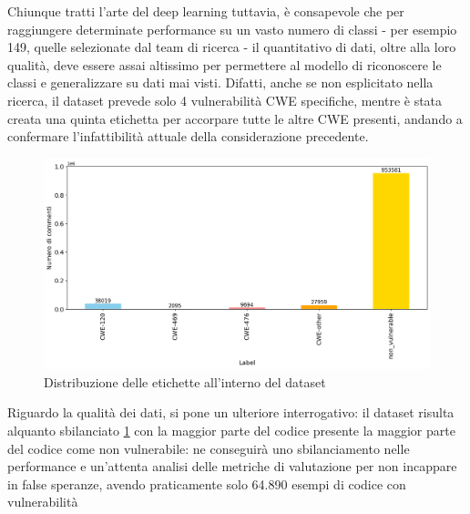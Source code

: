 \documentclass[conference]{IEEEtran}
\begin{document}
Chiunque tratti l'arte del deep learning tuttavia, è consapevole che per raggiungere determinate performance su un vasto numero di classi - per esempio 149, quelle selezionate dal team di ricerca - il quantitativo di dati, oltre alla loro qualità, deve essere assai altissimo per permettere al modello di riconoscere le classi e generalizzare su dati mai visti. Difatti, anche se non esplicitato nella ricerca, il dataset prevede solo 4 vulnerabilità CWE specifiche, mentre è stata creata una quinta etichetta per accorpare tutte le altre CWE presenti, andando a confermare l'infattibilità attuale della considerazione precedente.
%
\begin{figure}[h]
    \centering
    \includegraphics[width=\columnwidth]{images/VDISC/OSF-distribution.png}
    \caption{Distribuzione delle etichette all'interno del dataset}
    \label{fig:distribuzione-etichette}
\end{figure}
%
Riguardo la qualità dei dati, si pone un ulteriore interrogativo: il dataset risulta alquanto sbilanciato \ref{fig:distribuzione-etichette} con la maggior parte del codice presente  la maggior parte del codice come non vulnerabile: ne conseguirà uno sbilanciamento nelle performance e un'attenta analisi delle metriche di valutazione per non incappare in false speranze, avendo praticamente solo 64.890 esempi di codice con vulnerabilità
\end{document}
